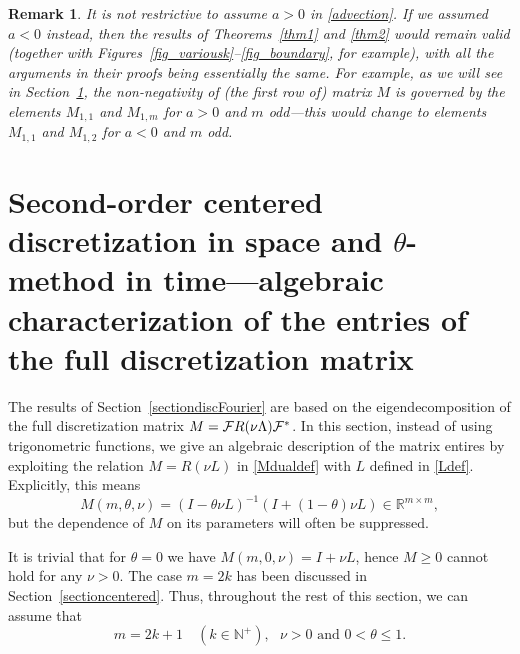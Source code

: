 \documentclass[a4paper]{article}
\newtheorem{remark}{Remark}
\newcommand{\te}{\theta}
\newcommand{\nplus}{\mathbb{N}^+}
\newcommand{\cF}{{\cal{F}}}
\begin{document}
\begin{remark}
It is not restrictive to assume $a>0$ in \eqref{advection}. If we assumed $a<0$ instead, then the results of Theorems~\ref{thm1} and \ref{thm2} would remain valid (together with Figures~\ref{fig_variousk}--\ref{fig_boundary}, for example), with all the arguments in their proofs being essentially the same.  For example, as we will see in Section~\ref{section3}, the non-negativity of (the first row of) matrix $M$ is governed by the elements $M_{1,1}$ and $M_{1,m}$ for $a>0$ and $m$ odd---this would change to elements $M_{1,1}$ and $M_{1,2}$ for $a<0$ and $m$ odd.
\end{remark}






\section{Second-order centered discretization in space and \texorpdfstring{$\theta$}{}-method in time---algebraic characterization of the entries of the full discretization matrix}\label{section3}

The results of Section~\ref{sectiondiscFourier} are based on the eigendecomposition of the full discretization matrix $M=\cF R(\nu \Lambda) \cF^*$. In this section, instead of using trigonometric functions, we give an algebraic description of the matrix entires by exploiting the relation $M=R(\nu L)$ in \eqref{Mdualdef} with $L$ defined in \eqref{Ldef}.
Explicitly, this means 
\begin{equation}\label{Mdef}
M(m,\te,\nu)=(I-\te\nu L)^{-1}(I+(1-\te)\nu L)\in\mathbb{R}^{m\times m},
\end{equation}
but the dependence of $M$ on its parameters will often be suppressed. 

It is trivial that for $\te=0$ we have $M(m,0,\nu)=I+\nu L$, hence $M\ge 0$ cannot hold for any $\nu>0$. The case $m=2k$ has been discussed in Section~\ref{sectioncentered}. Thus, throughout the rest of this section, we can assume that
\begin{equation}\label{genassump}
\boxed{ 
m=2k+1\quad (k\in\nplus), \ \ \ \nu>0 \text{\ \  and\ \  } 0<\te\le 1.}
\end{equation}
\end{document}
